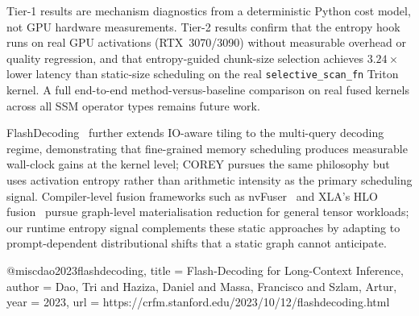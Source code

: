 %

Tier-1 results are mechanism diagnostics from a
deterministic Python cost model, not GPU hardware
measurements.
Tier-2 results confirm that the entropy hook runs
on real GPU activations (RTX~3070/3090) without
measurable overhead or quality regression, and that
entropy-guided chunk-size selection achieves
$3.24\times$ lower latency than static-size scheduling
on the real \texttt{selective\_scan\_fn} Triton kernel.
A full end-to-end method-versus-baseline comparison
on real fused kernels across all SSM operator types
remains future work.



FlashDecoding~\citep{dao2023flashdecoding} further
extends IO-aware tiling to the multi-query decoding
regime, demonstrating that fine-grained memory
scheduling produces measurable wall-clock gains at the
kernel level; COREY pursues the same philosophy but
uses activation entropy rather than arithmetic
intensity as the primary scheduling signal.
Compiler-level fusion frameworks such as
nvFuser~\citep{nvfuser2022} and XLA's HLO
fusion~\citep{xla2019} pursue graph-level
materialisation reduction for general tensor
workloads; our runtime entropy signal complements
these static approaches by adapting to prompt-dependent
distributional shifts that a static graph cannot
anticipate.



@misc{dao2023flashdecoding,
  title   = {{Flash-Decoding} for Long-Context Inference},
  author  = {Dao, Tri and Haziza, Daniel and Massa,
             Francisco and Szlam, Artur},
  year    = {2023},
  url     = {https://crfm.stanford.edu/2023/10/12/flashdecoding.html}
}


